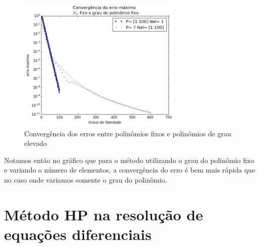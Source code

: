 \begin{figure}[!ht]
  \includegraphics[width=0.7\textwidth,center]{figuras/convergencia_erro_FEM2.png}
  \caption{Convergência dos erros entre polinômios fixos e polinômios de grau elevado}
\end{figure}

 Notamos então no gráfico  que para o método utilizando o grau do polinômio fixo e variando o número de elementos, a convergência do erro é bem mais rápida que no caso onde variamos somente o grau do polinômio.
\section{Método HP na resolução de equações diferenciais}

